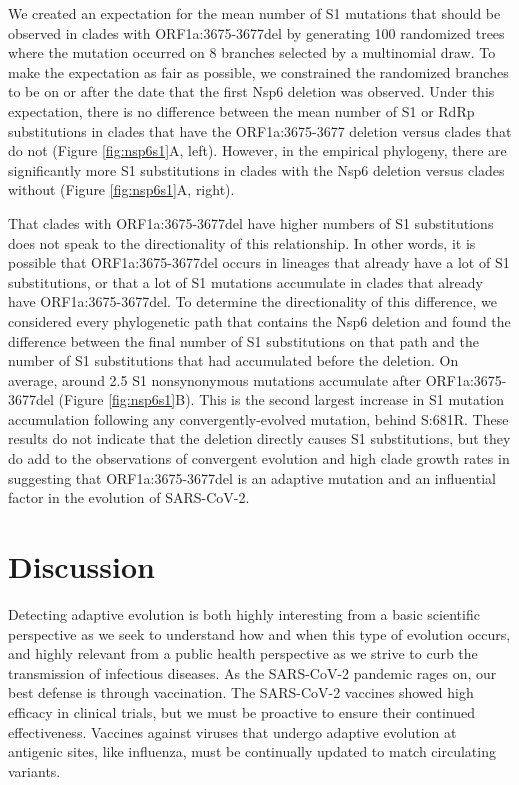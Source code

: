 \documentclass[11pt,oneside,letterpaper]{article}
\begin{document}
We created an expectation for the mean number of S1 mutations that should be observed in clades with ORF1a:3675-3677del by generating 100 randomized trees where the mutation occurred on 8 branches selected by a multinomial draw.
To make the expectation as fair as possible, we constrained the randomized branches to be on or after the date that the first Nsp6 deletion was observed.
Under this expectation, there is no difference between the mean number of S1 or RdRp substitutions in clades that have the ORF1a:3675-3677 deletion versus clades that do not (Figure \ref{fig:nsp6s1}A, left).
However, in the empirical phylogeny, there are significantly more S1 substitutions in clades with the Nsp6 deletion versus clades without (Figure \ref{fig:nsp6s1}A, right).

That clades with ORF1a:3675-3677del have higher numbers of S1 substitutions does not speak to the directionality of this relationship.
In other words, it is possible that ORF1a:3675-3677del occurs in lineages that already have a lot of S1 substitutions, or that a lot of S1 mutations accumulate in clades that already have ORF1a:3675-3677del.
To determine the directionality of this difference, we considered every phylogenetic path that contains the Nsp6 deletion and found the difference between the final number of S1 substitutions on that path and the number of S1 substitutions that had accumulated before the deletion.
On average, around 2.5 S1 nonsynonymous mutations accumulate after ORF1a:3675-3677del (Figure \ref{fig:nsp6s1}B).
This is the second largest increase in S1 mutation accumulation following any convergently-evolved mutation, behind S:681R.
These results do not indicate that the deletion directly causes S1 substitutions, but they do add to the observations of convergent evolution and high clade growth rates in suggesting that ORF1a:3675-3677del is an adaptive mutation and an influential factor in the evolution of SARS-CoV-2.



\section*{Discussion}
Detecting adaptive evolution is both highly interesting from a basic scientific perspective as we seek to understand how and when this type of evolution occurs, and highly relevant from a public health perspective as we strive to curb the transmission of infectious diseases.
As the SARS-CoV-2 pandemic rages on, our best defense is through vaccination.
The SARS-CoV-2 vaccines showed high efficacy in clinical trials, but we must be proactive to ensure their continued effectiveness.
Vaccines against viruses that undergo adaptive evolution at antigenic sites, like influenza, must be continually updated to match circulating variants.
\end{document}
